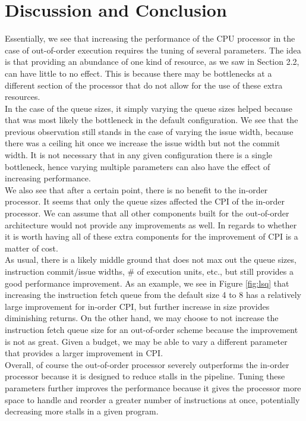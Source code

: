 \documentclass[twocolumn]{article}
\begin{document}
\section{Discussion and Conclusion}

Essentially, we see that increasing the performance of the CPU processor in the case of out-of-order execution requires the tuning of several parameters. The idea is that providing an abundance of one kind of resource, as we saw in Section 2.2, can have little to no effect. This is because there may be bottlenecks at a different section of the processor that do not allow for the use of these extra resources. \\

In the case of the queue sizes, it simply varying the queue sizes helped because that was most likely the bottleneck in the default configuration. We see that the previous observation still stands in the case of varying the issue width, because there was a ceiling hit once we increase the issue width but not the commit width. It is not necessary that in any given configuration there is a single bottleneck, hence varying multiple parameters can also have the effect of increasing performance. \\

We also see that after a certain point, there is no benefit to the in-order processor. It seems that only the queue sizes affected the CPI of the in-order processor. We can assume that all other components built for the out-of-order architecture would not provide any improvements as well. In regards to whether it is worth having all of these extra components for the improvement of CPI is a matter of cost.\\

As usual, there is a likely middle ground that does not max out the queue sizes, instruction commit/issue widths, # of execution units, etc., but still provides a good performance improvement. As an example, we see in Figure \ref{fig:lsq} that increasing the instruction fetch queue from the default size 4 to 8 has a relatively large improvement for in-order CPI, but further increase in size provides diminishing returns. On the other hand, we may choose to not increase the instruction fetch queue size for an out-of-order scheme because the improvement is not as great. Given a budget, we may be able to vary a different parameter that provides a larger improvement in CPI.\\

Overall, of course the out-of-order processor severely outperforms the in-order processor because it is designed to reduce stalls in the pipeline. Tuning these parameters further improves the performance because it gives the processor more space to handle and reorder a greater number of instructions at once, potentially decreasing more stalls in a given program. \\












\printbibliography
\end{document}
